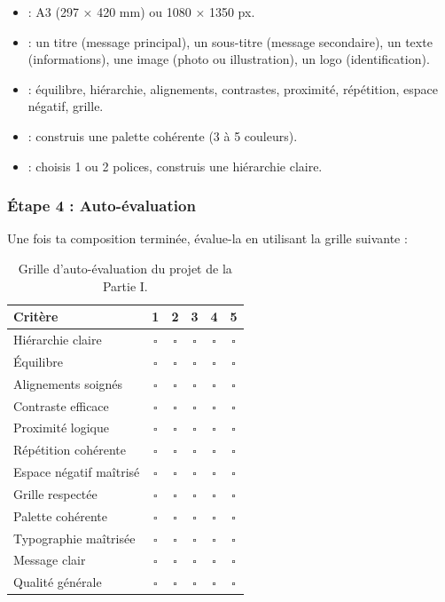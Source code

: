 \begin{itemize}
    \item {} : A3 (297 × 420 mm) ou 1080 × 1350 px.
    \item {} : un titre (message principal), un sous-titre (message secondaire), un texte (informations), une image (photo ou illustration), un logo (identification).
    \item {} : équilibre, hiérarchie, alignements, contrastes, proximité, répétition, espace négatif, grille.
    \item {} : construis une palette cohérente (3 à 5 couleurs).
    \item {} : choisis 1 ou 2 polices, construis une hiérarchie claire.
\end{itemize}

\subsubsection*{Étape 4 : Auto-évaluation}

Une fois ta composition terminée, évalue-la en utilisant la grille suivante :

\begin{table}[h!]
\centering
\begin{tabular}{@{}lccccc@{}}
\toprule
\textbf{Critère} & \textbf{1} & \textbf{2} & \textbf{3} & \textbf{4} & \textbf{5} \\
\midrule
Hiérarchie claire & \(\square\) & \(\square\) & \(\square\) & \(\square\) & \(\square\) \\
Équilibre & \(\square\) & \(\square\) & \(\square\) & \(\square\) & \(\square\) \\
Alignements soignés & \(\square\) & \(\square\) & \(\square\) & \(\square\) & \(\square\) \\
Contraste efficace & \(\square\) & \(\square\) & \(\square\) & \(\square\) & \(\square\) \\
Proximité logique & \(\square\) & \(\square\) & \(\square\) & \(\square\) & \(\square\) \\
Répétition cohérente & \(\square\) & \(\square\) & \(\square\) & \(\square\) & \(\square\) \\
Espace négatif maîtrisé & \(\square\) & \(\square\) & \(\square\) & \(\square\) & \(\square\) \\
Grille respectée & \(\square\) & \(\square\) & \(\square\) & \(\square\) & \(\square\) \\
Palette cohérente & \(\square\) & \(\square\) & \(\square\) & \(\square\) & \(\square\) \\
Typographie maîtrisée & \(\square\) & \(\square\) & \(\square\) & \(\square\) & \(\square\) \\
Message clair & \(\square\) & \(\square\) & \(\square\) & \(\square\) & \(\square\) \\
Qualité générale & \(\square\) & \(\square\) & \(\square\) & \(\square\) & \(\square\) \\
\bottomrule
\end{tabular}
\caption{Grille d'auto-évaluation du projet de la Partie I.}
\end{table}

